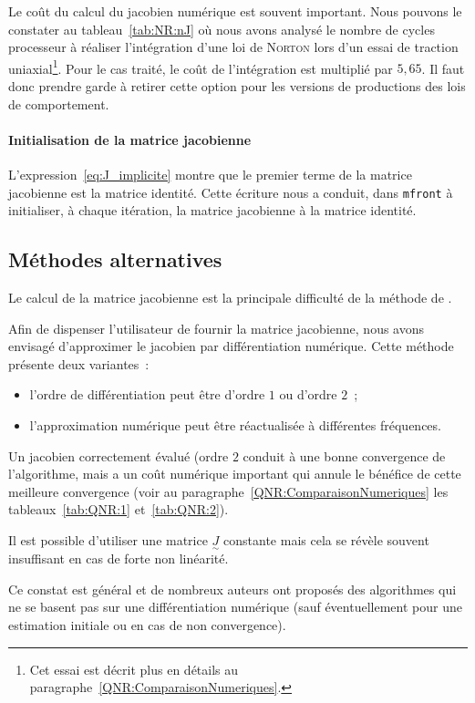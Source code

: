 \documentclass[rectoverso,pleiades,pstricks,leqno,anti]{texmf/note_technique_2010}
\newcommand{\mfront}{\texttt{mfront}}
\begin{document}
Le coût du calcul du jacobien numérique est souvent important. Nous
pouvons le constater au tableau~\ref{tab:NR:nJ} où nous avons analysé le
nombre de cycles processeur à réaliser l'intégration d'une loi de
\textsc{Norton} lors d'un essai de traction uniaxial\footnote{Cet essai
  est décrit plus en détails au
  paragraphe~\ref{QNR:ComparaisonNumeriques}.}. Pour le cas traité, le
coût de l'intégration est multiplié par \(5,65\). Il faut donc prendre
garde à retirer cette option pour les versions de productions des lois
de comportement.

\paragraph{Initialisation de la matrice jacobienne}
L'expression~\eqref{eq:J_implicite} montre que le premier terme de la
matrice jacobienne est la matrice identité. Cette écriture nous a
conduit, dans \mfront{} à initialiser, à chaque itération, la matrice
jacobienne à la matrice identité.

\subsection{Méthodes alternatives}

Le calcul de la matrice jacobienne est la principale difficulté de la
méthode de .

Afin de dispenser l'utilisateur de fournir la matrice jacobienne, nous
avons envisagé d'approximer le jacobien par différentiation numérique.
Cette méthode présente deux variantes~:
\begin{itemize}
  \item l'ordre de différentiation peut être d'ordre \(1\) ou d'ordre
  \(2\)~;
  \item l'approximation numérique peut être réactualisée à différentes
  fréquences.
\end{itemize}

Un jacobien correctement évalué (ordre \(2\) conduit à une bonne
convergence de l'algorithme, mais a un coût numérique important qui
annule le bénéfice de cette meilleure convergence (voir au
paragraphe~\ref{QNR:ComparaisonNumeriques} les tableaux~\ref{tab:QNR:1}
et~\ref{tab:QNR:2}).

Il est possible d'utiliser une matrice \(\underset{\sim}{J}\) constante
mais cela se révèle souvent insuffisant en cas de forte non linéarité.

Ce constat est général et de nombreux auteurs ont proposés des
algorithmes qui ne se basent pas sur une différentiation numérique (sauf
éventuellement pour une estimation initiale ou en cas de non
convergence).
\end{document}
